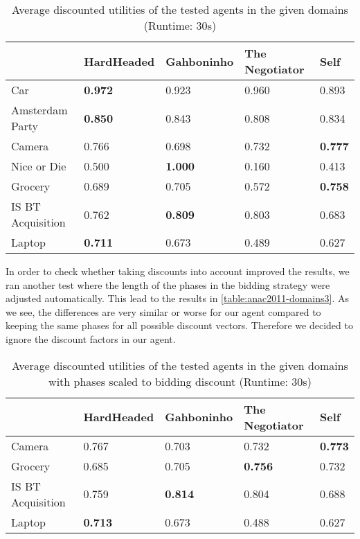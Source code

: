 \begin{table}[H]
  \centering
  \small
  \begin{tabular}{l|p{2.5cm}|p{2.5cm}|p{2.5cm}|p{2.5cm}|}
			    & HardHeaded     & Gahboninho     & The Negotiator & Self \\ \hline
  Car                       & \textbf{0.972} & 0.923          & 0.960          & 0.893 \\ \hline
  Amsterdam Party           & \textbf{0.850} & 0.843          & 0.808          & 0.834 \\ \hline
  Camera                    & 0.766          & 0.698          & 0.732          & \textbf{0.777} \\ \hline
  Nice or Die               & 0.500          & \textbf{1.000} & 0.160          & 0.413 \\ \hline
  Grocery                   & 0.689          & 0.705          & 0.572          & \textbf{0.758} \\ \hline
  IS BT Acquisition         & 0.762          & \textbf{0.809} & 0.803          & 0.683 \\ \hline
  Laptop                    & \textbf{0.711} & 0.673          & 0.489          & 0.627 \\ \hline
  \end{tabular}
  \caption{Average discounted utilities of the tested agents in the given domains (Runtime: $30$s) \label{table:anac2011-domains2}}
\end{table}

In order to check whether taking discounts into account improved the results, we ran another test where the length of the phases in the bidding strategy were adjusted automatically. This lead to the results in \autoref{table:anac2011-domains3}. As we see, the differences are very similar or worse for our agent compared to keeping the same phases for all possible discount vectors. Therefore we decided to ignore the discount factors in our agent.

\begin{table}[H]
  \centering
  \small
  \begin{tabular}{l|p{2.5cm}|p{2.5cm}|p{2.5cm}|p{2.5cm}|}
                            & HardHeaded     & Gahboninho & The Negotiator & Self \\ \hline
  Camera                    & 0.767          & 0.703          & 0.732          & \textbf{0.773} \\ \hline
  Grocery                   & 0.685          & 0.705          & \textbf{0.756} & 0.732          \\ \hline
  IS BT Acquisition         & 0.759          & \textbf{0.814} & 0.804          & 0.688          \\ \hline
  Laptop                    & \textbf{0.713} & 0.673          & 0.488          & 0.627          \\ \hline
  \end{tabular}
  \caption{Average discounted utilities of the tested agents in the given domains with phases scaled to bidding discount (Runtime: $30$s) \label{table:anac2011-domains3}}
\end{table}
